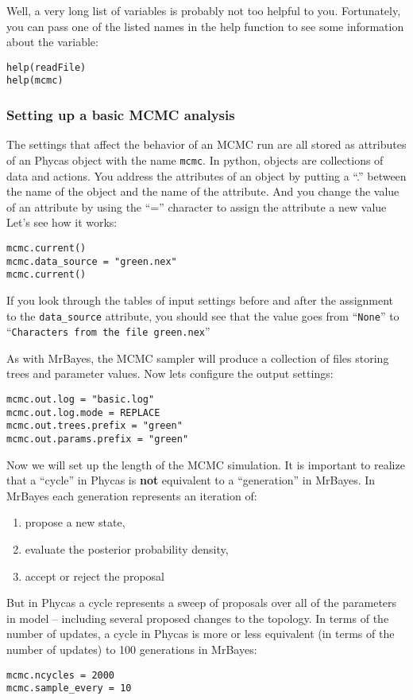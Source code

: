 \documentclass{article}
\newcommand{\cmdopt}[1]{\texttt{#1}\xspace}
\newcommand{\cmd}[1]{\texttt{#1}\xspace}
\newcommand{\mb}{MrBayes\xspace}
\newcommand{\phycas}{Phycas\xspace}
\begin{document}
Well, a very long list of variables is probably not too helpful to you.
Fortunately, you can pass one of the listed names in the help function to see 
some information about the variable:
\begin{verbatim}
help(readFile)
help(mcmc)
\end{verbatim}

\subsubsection{Setting up a basic MCMC analysis}
The settings that affect the behavior of an MCMC run are all stored
as attributes of an \phycas object with the name \cmd{mcmc}.
In python, objects are collections of data and actions.
You address the attributes of an object by putting a ``.'' between
the name of the object and the name of the attribute.
And you change the value of an attribute by using the ``='' character
to assign the attribute a new value
Let's see how it works:
\begin{verbatim}
mcmc.current()
mcmc.data_source = "green.nex"
mcmc.current()
\end{verbatim}
If you look through the tables of input settings before and after
the assignment to the \cmdopt{data\_source} attribute, you should see
that the value goes from ``\cmd{None}'' to ``\cmd{Characters from the file green.nex}''

As with \mb\citep{RonquistH2003}, the MCMC sampler will produce a collection of files storing
trees and parameter values.
Now lets configure the output settings:
\begin{verbatim}
mcmc.out.log = "basic.log"
mcmc.out.log.mode = REPLACE
mcmc.out.trees.prefix = "green"
mcmc.out.params.prefix = "green"
\end{verbatim}

Now we will set up the length of the MCMC simulation. 
It is important to realize that a ``cycle'' in \phycas is {\bf not}
equivalent to a ``generation'' in \mb.
In \mb each generation represents an iteration of:
\begin{enumerate}
	\item propose a new state,
	\item evaluate the posterior probability density,
	\item accept or reject the proposal
\end{enumerate}
But in \phycas a cycle represents a sweep of proposals over all of the parameters
in model -- including several proposed changes to the topology.
In terms of the number of updates, a cycle in \phycas is more or less equivalent (in terms 
of the number of updates) to 100 generations in \mb:
\begin{verbatim}
mcmc.ncycles = 2000
mcmc.sample_every = 10
\end{verbatim}
\end{document}
